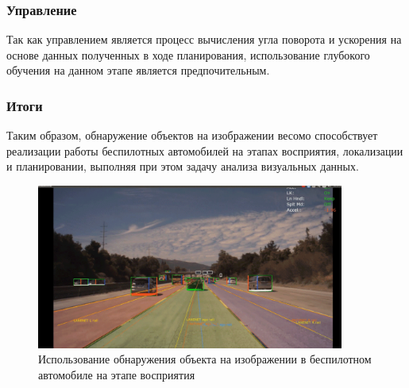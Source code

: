 \documentclass[bachelor, och, coursework]{SCWorks}
\begin{document}
        \subsubsection{Управление}
            Так как управлением является процесс вычисления угла поворота и ускорения на основе данных полученных в ходе планирования, использование глубокого обучения на данном этапе является предпочительным.
        
        \subsubsection{Итоги}
            Таким образом, обнаружение объектов на изображении весомо способствует реализации работы беспилотных автомобилей на этапах восприятия, локализации и планировании, выполняя при этом задачу анализа визуальных данных.\\
            \begin{figure}[H]
                \centering
                \includegraphics[width=0.9\textwidth]{pic/auto.png}
                \caption{Использование обнаружения объекта на изображении в беспилотном автомобиле на этапе восприятия}
                \label{fig:img20}
            \end{figure}
\end{document}
